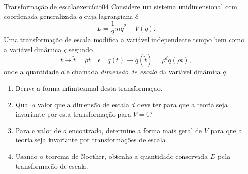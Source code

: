 \begin{exercício}{Transformação de escala}{exercício04}
    Considere um sistema unidimensional com coordenada generalizada \(q\) cuja lagrangiana é
    \begin{equation*}
        L = \frac12 m \dot{q}^2 - V(q).
    \end{equation*}
    Uma transformação de escala modifica a variável independente tempo bem como a variável dinâmica \(q\) segundo
    \begin{equation*}
        t \to \tilde{t} = \rho t\quad\text{e}\quad q(t) \to \tilde{q}(\tilde{t}) = \rho^d q(\rho t),
    \end{equation*}
    onde a quantidade \(d\) é chamada \emph{dimensão de escala} da variável dinâmica \(q\).
    \begin{enumerate}[label=(\alph*)]
        \item Derive a forma infinitesimal desta transformação.
        \item Qual o valor que a dimensão de escala \(d\) deve ter para que a teoria seja invariante por esta transformação para \(V = 0\)?
        \item Para o valor de \(d\) encontrado, determine a forma mais geral de \(V\) para que a teoria seja invariante por transformações de escala.
        \item Usando o teorema de Noether, obtenha a quantidade conservada \(D\) pela transformação de escala.
    \end{enumerate}
\end{exercício}
